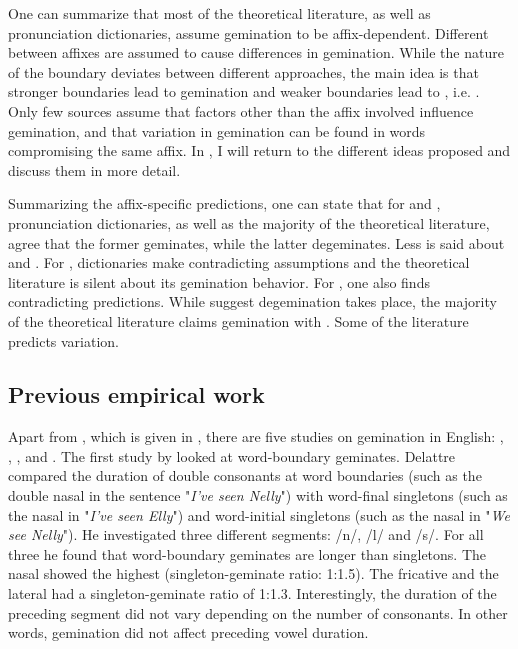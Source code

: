  
One can summarize that most of the theoretical literature, as well as pronunciation dictionaries, assume gemination to be affix-dependent. Different  between affixes are assumed to cause differences in gemination. While the nature of the boundary deviates between different approaches, the main idea is that stronger boundaries lead to gemination and weaker boundaries lead to , i.e. . Only few sources assume that factors other than the affix involved influence gemination, and that variation in gemination can be found in words compromising the same affix.  In , I will return to the different ideas proposed and discuss them in more detail. 

Summarizing the affix-specific predictions, one can state that for  and , pronunciation dictionaries, as well as the majority of the theoretical literature, agree that the former geminates, while the latter {degeminates}. Less is said about  and . For , dictionaries make contradicting assumptions and the theoretical literature is silent about its gemination behavior. For , one also finds contradicting predictions. While \cite{Wells.2008} suggest {degemination} takes place, the majority of the theoretical literature claims gemination with . Some of the literature predicts variation. 

\subsection{Previous empirical work}\label{previous empirical work}

Apart from \cite{BenHedia.2017}, which is given in , there are five studies on gemination in English: \cite{Delattre.}, \cite{ Kaye.2005}, \cite{Oh.2012}, \cite{Oh.2013}   and \cite{Kotzor.2016}.   %
The first study by \cite{Delattre.} looked at word-boundary geminates. Delattre compared the duration of double consonants at word boundaries (such as the double nasal  in the sentence "\textit{I've seen Nelly}") with word-final singletons (such as the nasal in "\textit{I've seen Elly}") and word-initial singletons (such as the nasal in "\textit{We see Nelly}"). He investigated three different segments: /n/, /l/ and /s/. For all three he found that word-boundary geminates are longer than singletons. The nasal showed the highest  (singleton-geminate ratio: 1:1.5). The fricative and the lateral had a singleton-geminate ratio of 1:1.3. Interestingly, the duration of the preceding segment did not vary depending on the number of consonants. In other words, gemination did not affect preceding vowel duration.

